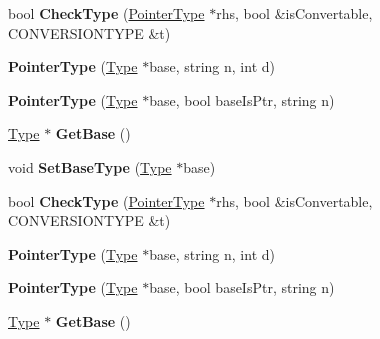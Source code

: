 \begin{DoxyCompactItemize}
\item 
\hypertarget{classPointerType_a01b7271726a3f891c9556cbbab3a4410}{bool {\bfseries Check\-Type} (\hyperlink{classPointerType}{Pointer\-Type} $\ast$rhs, bool \&is\-Convertable, C\-O\-N\-V\-E\-R\-S\-I\-O\-N\-T\-Y\-P\-E \&t)}\label{classPointerType_a01b7271726a3f891c9556cbbab3a4410}

\item 
\hypertarget{classPointerType_acb7c1bf4a82371e46d133a1471d1e3f3}{{\bfseries Pointer\-Type} (\hyperlink{classType}{Type} $\ast$base, string n, int d)}\label{classPointerType_acb7c1bf4a82371e46d133a1471d1e3f3}

\item 
\hypertarget{classPointerType_a58dbecb35ecd7ba2901db09aba00dcc7}{{\bfseries Pointer\-Type} (\hyperlink{classType}{Type} $\ast$base, bool base\-Is\-Ptr, string n)}\label{classPointerType_a58dbecb35ecd7ba2901db09aba00dcc7}

\item 
\hypertarget{classPointerType_acfdee349a0e18abd304f85d0b6d951ff}{\hyperlink{classType}{Type} $\ast$ {\bfseries Get\-Base} ()}\label{classPointerType_acfdee349a0e18abd304f85d0b6d951ff}

\item 
\hypertarget{classPointerType_abfb4082aafcedbe8660cfadabbe79f18}{void {\bfseries Set\-Base\-Type} (\hyperlink{classType}{Type} $\ast$base)}\label{classPointerType_abfb4082aafcedbe8660cfadabbe79f18}

\item 
\hypertarget{classPointerType_a01b7271726a3f891c9556cbbab3a4410}{bool {\bfseries Check\-Type} (\hyperlink{classPointerType}{Pointer\-Type} $\ast$rhs, bool \&is\-Convertable, C\-O\-N\-V\-E\-R\-S\-I\-O\-N\-T\-Y\-P\-E \&t)}\label{classPointerType_a01b7271726a3f891c9556cbbab3a4410}

\item 
\hypertarget{classPointerType_acb7c1bf4a82371e46d133a1471d1e3f3}{{\bfseries Pointer\-Type} (\hyperlink{classType}{Type} $\ast$base, string n, int d)}\label{classPointerType_acb7c1bf4a82371e46d133a1471d1e3f3}

\item 
\hypertarget{classPointerType_a58dbecb35ecd7ba2901db09aba00dcc7}{{\bfseries Pointer\-Type} (\hyperlink{classType}{Type} $\ast$base, bool base\-Is\-Ptr, string n)}\label{classPointerType_a58dbecb35ecd7ba2901db09aba00dcc7}

\item 
\hypertarget{classPointerType_acfdee349a0e18abd304f85d0b6d951ff}{\hyperlink{classType}{Type} $\ast$ {\bfseries Get\-Base} ()}\label{classPointerType_acfdee349a0e18abd304f85d0b6d951ff}


\end{DoxyCompactItemize}
